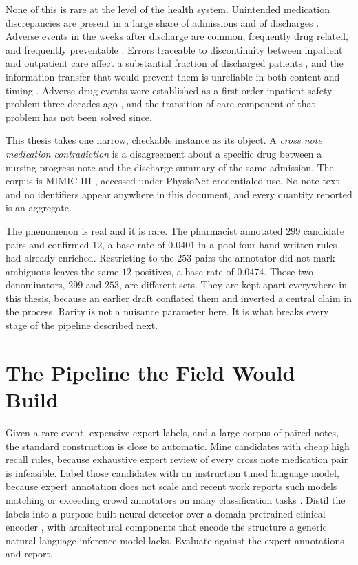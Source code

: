 None of this is rare at the level of the health system. Unintended medication
discrepancies are present in a large share of admissions
\citep{cornish2005discrepancies} and of discharges
\citep{wong2008reconciliation}. Adverse events in the weeks after discharge are
common, frequently drug related, and frequently preventable
\citep{forster2003adverse}. Errors traceable to discontinuity between inpatient
and outpatient care affect a substantial fraction of discharged patients
\citep{moore2003discontinuity}, and the information transfer that would prevent
them is unreliable in both content and timing \citep{kripalani2007deficits}.
Adverse drug events were established as a first order inpatient safety problem
three decades ago \citep{bates1995ade}, and the transition of care component of
that problem has not been solved since.

This thesis takes one narrow, checkable instance as its object. A \emph{cross
note medication contradiction} is a disagreement about a specific drug between a
nursing progress note and the discharge summary of the same admission. The
corpus is MIMIC-III \citep{johnson2016mimic}, accessed under PhysioNet
credentialed use. No note text and no identifiers appear anywhere in this
document, and every quantity reported is an aggregate.

The phenomenon is real and it is rare. The pharmacist annotated $299$ candidate
pairs and confirmed $12$, a base rate of $0.0401$ in a pool four hand written
rules had already enriched. Restricting to the $253$ pairs the annotator did not
mark ambiguous leaves the same $12$ positives, a base rate of $0.0474$. Those
two denominators, $299$ and $253$, are different sets. They are kept apart
everywhere in this thesis, because an earlier draft conflated them and inverted
a central claim in the process. Rarity is not a nuisance parameter here. It is
what breaks every stage of the pipeline described next.

\section{The Pipeline the Field Would Build}
\label{sec:intro-pipeline}

Given a rare event, expensive expert labels, and a large corpus of paired notes,
the standard construction is close to automatic. Mine candidates with cheap high
recall rules, because exhaustive expert review of every cross note medication
pair is infeasible. Label those candidates with an instruction tuned language
model, because expert annotation does not scale and recent work reports such
models matching or exceeding crowd annotators on many classification tasks
\citep{gilardi2023chatgpt}. Distil the labels into a purpose built neural
detector over a domain pretrained clinical encoder
\citep{gu2021biomedbert,alsentzer2019clinicalbert}, with architectural
components that encode the structure a generic natural language inference model
lacks. Evaluate against the expert annotations and report.

